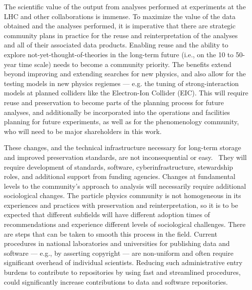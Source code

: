 \documentclass[11pt]{article}
\begin{document}
The scientific value of the output from analyses performed at experiments at the LHC and other collaborations is immense.
To maximize the value of the data obtained and the analyses performed, it is imperative that there are strategic community plans in practice for the reuse and reinterpretation of the analyses and all of their associated data products.
Enabling reuse and the ability to explore not-yet-thought-of-theories in the long-term future (i.e., on the 10 to 50-year time scale) needs to become a community priority.
The benefits extend beyond improving and extending searches for new physics, and also allow for the testing models in new physics regiemes --- e.g. the tuning of strong-interaction models at planned colliders like the Electron-Ion Collider (EIC).
This will require reuse and preservation to become parts of the planning process for future analyses, and additionally be incorporated into the operations and facilities planning for future experiments, as well as for the phenomenology community, who will need to be major shareholders in this work.

These changes, and the technical infrastructure necessary for long-term storage and improved preservation standards, are not inconsequential or easy.~\cite{LHCReinterpretationForum:2020xtr,Cranmer:2021urp}
They will require development of standards, software, cyberinfrastructure, stewardship roles, and additional support from funding agencies.
Changes at fundamental levels to the community's approach to analysis will necessarily require additional sociological changes.
The particle physics community is not homogeneous in its experiences and practices with preservation and reinterpretation, so it is to be expected that different subfields will have different adoption times of recommendations and experience different levels of sociological challenges.
There are steps that can be taken to smooth this process in the field.
%
Current procedures in national laboratories and universities for publishing data and software --- e.g., by asserting copyright --- are non-uniform and often require significant overhead of individual scientists.
Reducing such administrative entry burdens to contribute to repositories by using fast and streamlined procedures,
could significantly increase contributions to data and software repositories.
\end{document}
